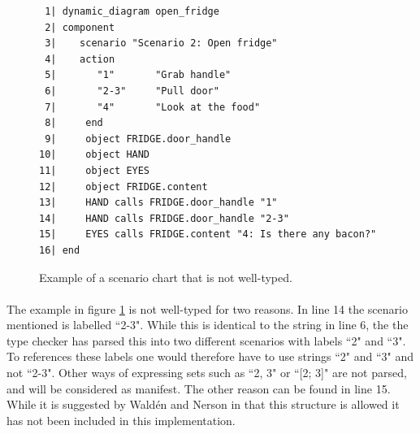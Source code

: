 \begin{figure}[H]
{\footnotesize
\begin{verbatim}
 1| dynamic_diagram open_fridge
 2| component
 3|    scenario "Scenario 2: Open fridge"
 4|    action
 5|       "1"       "Grab handle"
 6|       "2-3"     "Pull door"
 7|       "4"       "Look at the food"
 8|     end
 9|     object FRIDGE.door_handle 
10|     object HAND
11|     object EYES
12|     object FRIDGE.content
13|     HAND calls FRIDGE.door_handle "1"
14|     HAND calls FRIDGE.door_handle "2-3"
15|     EYES calls FRIDGE.content "4: Is there any bacon?"
16| end
\end{verbatim}
}
\caption{Example of a scenario chart that is not well-typed.}
\label{fig:not_well_typed}
\end{figure}

\paragraph{}
The example in figure \ref{fig:not_well_typed} is not well-typed for two reasons. In line 14 the scenario mentioned is labelled ``2-3". While this is identical to the string in line 6, the the type checker has parsed this into two different scenarios with labels ``2" and ``3". To references these labels one would therefore have to use strings ``2" and ``3" and not ``2-3". Other ways of expressing sets such as ``2, 3" or ``[2; 3]" are not parsed, and will be considered as manifest. The other reason can be found in line 15. While it is suggested by Wald\'{e}n and Nerson in \cite{walden1995} that this structure is allowed it has not been included in this implementation.